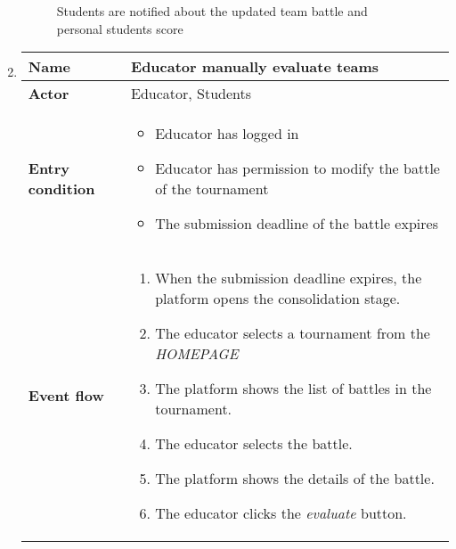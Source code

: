 \begin{enumerate}[label=\textbf{UC\arabic*}:,leftmargin=1.3cm]
            \begin{figure}[H]
                  \centering
                  \caption{Students are notified about the updated team battle and personal students score}
                  \label{fig:Students are notified about the updated team battle and personal students score}
            \end{figure}
            \pagebreak
      \item \textbf{}
            \begin{table}[H]
                  \centering
                  \begin{tabular}{|l|p{11.9cm}|}
                        \hline
                        \textbf{Name}            & Educator manually evaluate teams                                            \\\hline
                        \textbf{Actor}           & Educator, Students                                                          \\\hline
                        \textbf{Entry condition} &
                        \begin{itemize}
                              \item Educator has logged in
                              \item Educator has permission to modify the battle of the tournament
                              \item The submission deadline of the battle expires
                        \end{itemize}                                    \\\hline
                        \textbf{Event flow}      &
                        \begin{enumerate}[label=\arabic*.]
                              \item When the submission deadline expires, the platform opens the consolidation stage.
                              \item The educator selects a tournament from the \emph{HOMEPAGE}
                              \item The platform shows the list of battles in the tournament.
                              \item The educator selects the battle.
                              \item The platform shows the details of the battle.
                              \item The educator clicks the \emph{evaluate} button.

\end{enumerate}
\end{tabular}
\end{table}
\end{enumerate}

